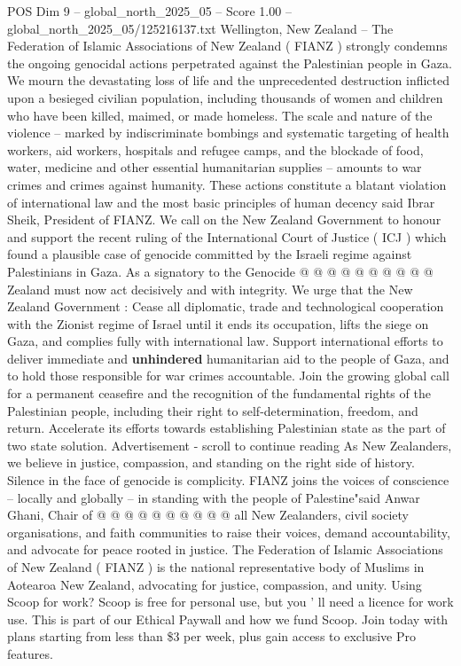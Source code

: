 \begin{textsample}{POS Dim 9 – global\_north\_2025\_05 – Score 1.00 – global\_north\_2025\_05/125216137.txt}  \label{ex:f9_pos_364}
Wellington, New Zealand -- The Federation of Islamic Associations of New Zealand ( FIANZ ) strongly condemns the ongoing genocidal actions perpetrated against the Palestinian people in Gaza.
We mourn the devastating loss of life and the unprecedented destruction inflicted upon a besieged civilian population, including thousands of women and children who have been killed, maimed, or made homeless.
The scale and nature of the violence -- marked by indiscriminate bombings and systematic targeting of health workers, aid workers, hospitals and refugee camps, and the blockade of food, water, medicine and other essential humanitarian supplies -- amounts to war crimes and crimes against humanity.
These actions constitute a blatant violation of international law and the most basic principles of human decency said Ibrar Sheik, President of FIANZ.
We call on the New Zealand Government to honour and support the recent ruling of the International Court of Justice ( ICJ ) which found a plausible case of genocide committed by the Israeli regime against Palestinians in Gaza.
As a signatory to the Genocide @ @ @ @ @ @ @ @ @ @ Zealand must now act decisively and with integrity.
We urge that the New Zealand Government : Cease all diplomatic, trade and technological cooperation with the Zionist regime of Israel until it ends its occupation, lifts the siege on Gaza, and complies fully with international law.
Support international efforts to deliver immediate and \textbf{unhindered} humanitarian aid to the people of Gaza, and to hold those responsible for war crimes accountable.
Join the growing global call for a permanent ceasefire and the recognition of the fundamental rights of the Palestinian people, including their right to self-determination, freedom, and return.
Accelerate its efforts towards establishing Palestinian state as the part of two state solution.
Advertisement - scroll to continue reading As New Zealanders, we believe in justice, compassion, and standing on the right side of history.
Silence in the face of genocide is complicity.
FIANZ joins the voices of conscience -- locally and globally -- in standing with the people of Palestine"said Anwar Ghani, Chair of @ @ @ @ @ @ @ @ @ @ all New Zealanders, civil society organisations, and faith communities to raise their voices, demand accountability, and advocate for peace rooted in justice.
The Federation of Islamic Associations of New Zealand ( FIANZ ) is the national representative body of Muslims in Aotearoa New Zealand, advocating for justice, compassion, and unity.
Using Scoop for work?
Scoop is free for personal use, but you ' ll need a licence for work use.
This is part of our Ethical Paywall and how we fund Scoop.
Join today with plans starting from less than \$3 per week, plus gain access to exclusive Pro features.

\end{textsample}
